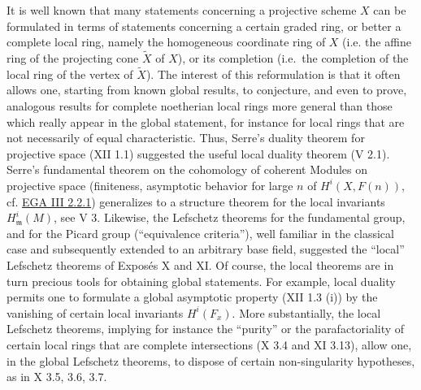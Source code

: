 \documentclass[
  11pt,
  a4paper,
]{book}
\begin{document}
It is well known that many statements concerning a projective scheme
\(X\) can be formulated in terms of statements concerning a certain
graded ring, or better a complete local ring, namely the homogeneous
coordinate ring of \(X\) (i.e. the affine ring of the projecting cone
\(\tilde{X}\) of \(X\)), or its completion (i.e.~the completion of the
local ring of the vertex of \(\tilde{X}\)). The interest of this
reformulation is that it often allows one, starting from known global
results, to conjecture, and even to prove, analogous results for
complete noetherian local rings more general than those which really
appear in the global statement, for instance for local rings that are
not necessarily of equal characteristic. Thus, Serre's duality theorem
for projective space (XII 1.1) suggested the useful local duality
theorem (V 2.1). Serre's fundamental theorem on the cohomology of
coherent Modules on projective space (finiteness, asymptotic behavior
for large \(n\) of \(H^{i}(X, F(n))\), cf.
\href{https://jcreinhold.github.io/ega/iii/09-ch3-02-cohomology-projective-morphisms.html\#22-the-fundamental-theorem-of-projective-morphisms}{EGA
III 2.2.1}) generalizes to a structure theorem for the local invariants
\(H^{i}_{\mathfrak{m}}(M)\), see V 3. Likewise, the Lefschetz theorems
for the fundamental group, and for the Picard group (``equivalence
criteria''), well familiar in the classical case and subsequently
extended to an arbitrary base field, suggested the ``local'' Lefschetz
theorems of Exposés X and XI. Of course, the local theorems are in turn
precious tools for obtaining global statements. For example, local
duality permits one to formulate a global asymptotic property (XII 1.3
(i)) by the vanishing of certain local invariants \(H^{i}(F_{x})\). More
substantially, the local Lefschetz theorems, implying for instance the
``purity'' or the parafactoriality of certain local rings that are
complete intersections (X 3.4 and XI 3.13), allow one, in the global
Lefschetz theorems, to dispose of certain non-singularity hypotheses, as
in X 3.5, 3.6, 3.7.
\end{document}
